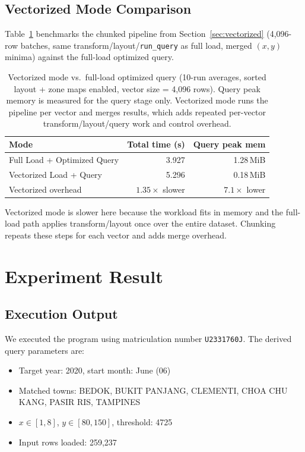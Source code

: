 \documentclass[11pt,a4paper]{article}
\begin{document}
\subsection{Vectorized Mode Comparison}

Table~\ref{tab:vec} benchmarks the chunked pipeline from Section~\ref{sec:vectorized} (4,096-row batches, same transform/layout/\texttt{run\_query} as full load, merged $(x,y)$ minima) against the full-load optimized query.

\begin{table}[H]
\centering
\begin{tabular}{l r r}
\toprule
\textbf{Mode} & \textbf{Total time (s)} & \textbf{Query peak mem} \\
\midrule
Full Load + Optimized Query & 3.927 & 1.28\,MiB \\
Vectorized Load + Query     & 5.296 & 0.18\,MiB \\
\midrule
Vectorized overhead         & $1.35\times$ slower & $7.1\times$ lower \\
\bottomrule
\end{tabular}
\caption{Vectorized mode vs.\ full-load optimized query (10-run averages, sorted layout + zone maps enabled, vector size = 4,096 rows). Query peak memory is measured for the query stage only. Vectorized mode runs the pipeline per vector and merges results, which adds repeated per-vector transform/layout/query work and control overhead.}
\label{tab:vec}
\end{table}

Vectorized mode is slower here because the workload fits in memory and the full-load path applies transform/layout once over the entire dataset. Chunking repeats these steps for each vector and adds merge overhead.


\section{Experiment Result}

\subsection{Execution Output}

We executed the program using matriculation number \texttt{U2331760J}. The derived query parameters are:
\begin{itemize}[nosep]
    \item Target year: 2020, start month: June (06)
    \item Matched towns: BEDOK, BUKIT PANJANG, CLEMENTI, CHOA CHU KANG, PASIR RIS, TAMPINES
    \item $x \in [1, 8]$, $y \in [80, 150]$, threshold: 4725
    \item Input rows loaded: 259,237
\end{itemize}
\end{document}
